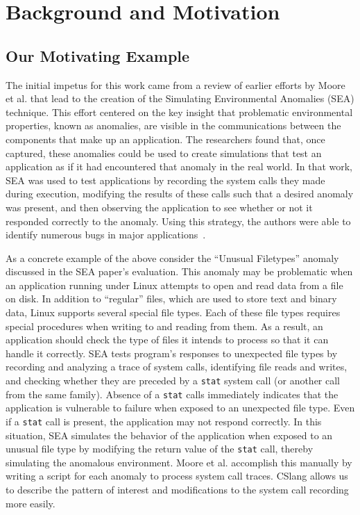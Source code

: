 \section{Background and Motivation}
\label{SEC:background}


\subsection{Our Motivating Example}
\label{sec:MotivatingExample}

The initial impetus for this work came from a review
of earlier efforts by Moore et al.
that lead to the creation of
the Simulating Environmental Anomalies (SEA) technique.
This effort centered on the key insight
that problematic
environmental properties,
known as anomalies, are visible in the
communications between the components that make up an application.
The researchers found that,
once captured,
these anomalies
could be
used to create simulations
that test
an application as if
it had encountered that anomaly
in the real world.
In that work, SEA was used to test applications
by recording the system calls they made
during execution,
modifying the results of these calls such that a desired anomaly
was present,
and then observing the application to see whether or not it
responded correctly to the anomaly.
Using this strategy, the authors were able to identify numerous bugs
in major applications~\cite{DBLP:conf/issre/MooreCFW19}.

As a concrete example of the above
consider the ``Unusual Filetypes'' anomaly
discussed in the SEA paper's evaluation.
This anomaly may be problematic
when an application running under Linux
attempts to open and read data from a file on disk.
In addition to ``regular'' files,
which are used to store text and
binary data,
Linux supports several special file types.
Each of these file types requires special procedures when writing to and
reading from them.
As a result, an application should check the type of files it intends to
process so that it can handle it correctly.
SEA tests program's responses
to unexpected file types
by recording and analyzing a trace of system calls,
identifying file reads and writes,
and checking whether they are preceded by a {\tt stat}
system call (or another call from the same family).
Absence of a {\tt stat} calls
immediately indicates
that the application is vulnerable
to failure
when exposed to an unexpected file type.
Even if a {\tt stat} call is present,
the application may not respond correctly.
In this situation,
SEA simulates
the behavior
of the application
when exposed
to an unusual file type
by modifying the return value
of the {\tt stat} call,
thereby simulating the anomalous environment.
Moore et al. accomplish this manually
by writing a script
for each anomaly
to process system call traces.
CSlang allows us to describe
the pattern of interest
and modifications
to the system call recording
more easily.

